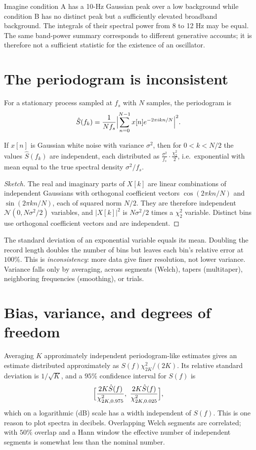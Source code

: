 \begin{workedexample}
Imagine condition A has a 10-Hz Gaussian peak over a low background while condition B has no distinct peak but a sufficiently elevated broadband background. The integrals of their spectral power from 8 to 12 Hz may be equal. The same band-power summary corresponds to different generative accounts; it is therefore not a sufficient statistic for the existence of an oscillator.
\end{workedexample}
\section{The periodogram is inconsistent}
For a stationary process sampled at $f_s$ with $N$ samples, the periodogram is
\[
\hat S(f_k)=\frac{1}{Nf_s}\Bigl|\sum_{n=0}^{N-1}x[n]e^{-2\pi ikn/N}\Bigr|^2.
\]
\begin{proposition}
If $x[n]$ is Gaussian white noise with variance $\sigma^2$, then for $0<k<N/2$ the values $\hat S(f_k)$ are independent, each distributed as $\frac{\sigma^2}{f_s}\cdot\frac{\chi^2_2}{2}$, i.e.\ exponential with mean equal to the true spectral density $\sigma^2/f_s$.
\end{proposition}
\begin{proof}[Sketch]
The real and imaginary parts of $X[k]$ are linear combinations of independent Gaussians with orthogonal coefficient vectors $\cos(2\pi kn/N)$ and $\sin(2\pi kn/N)$, each of squared norm $N/2$. They are therefore independent $\mathcal N(0,N\sigma^2/2)$ variables, and $|X[k]|^2$ is $N\sigma^2/2$ times a $\chi^2_2$ variable. Distinct bins use orthogonal coefficient vectors and are independent.
\end{proof}
The standard deviation of an exponential variable equals its mean. Doubling the record length doubles the number of bins but leaves each bin's relative error at $100\%$. This is \emph{inconsistency}: more data give finer resolution, not lower variance. Variance falls only by averaging, across segments (Welch), tapers (multitaper), neighboring frequencies (smoothing), or trials.

\section{Bias, variance, and degrees of freedom}
Averaging $K$ approximately independent periodogram-like estimates gives an estimate distributed approximately as $S(f)\chi^2_{2K}/(2K)$. Its relative standard deviation is $1/\sqrt K$, and a $95\%$ confidence interval for $S(f)$ is
\[
\Bigl[\frac{2K\hat S(f)}{\chi^2_{2K,0.975}},\ \frac{2K\hat S(f)}{\chi^2_{2K,0.025}}\Bigr],
\]
which on a logarithmic (dB) scale has a width independent of $S(f)$. This is one reason to plot spectra in decibels. Overlapping Welch segments are correlated; with $50\%$ overlap and a Hann window the effective number of independent segments is somewhat less than the nominal number.

